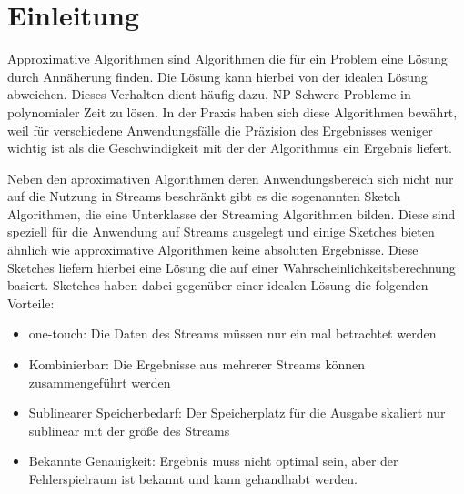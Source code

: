 \section{Einleitung}
Approximative Algorithmen sind Algorithmen die für ein Problem eine Lösung durch Annäherung finden. Die Lösung kann hierbei von der idealen Lösung abweichen. Dieses Verhalten dient häufig dazu, NP-Schwere Probleme in polynomialer Zeit zu lösen.
In der Praxis haben sich diese Algorithmen bewährt, weil für verschiedene Anwendungsfälle die Präzision des Ergebnisses weniger wichtig ist als die Geschwindigkeit mit der der Algorithmus ein Ergebnis liefert.


Neben den aproximativen Algorithmen deren Anwendungsbereich sich nicht nur auf die Nutzung in Streams beschränkt gibt es die sogenannten Sketch Algorithmen, die eine Unterklasse der Streaming Algorithmen bilden. Diese sind speziell für die Anwendung auf Streams ausgelegt und einige Sketches bieten ähnlich wie approximative Algorithmen keine absoluten Ergebnisse. Diese Sketches liefern hierbei eine Lösung die auf einer Wahrscheinlichkeitsberechnung basiert.
Sketches haben dabei gegenüber einer idealen Lösung die folgenden Vorteile:
\begin{itemize}
\item one-touch: Die Daten des Streams müssen nur ein mal betrachtet werden
\item Kombinierbar: Die Ergebnisse aus mehrerer Streams können zusammengeführt werden
\item Sublinearer Speicherbedarf: Der Speicherplatz für die Ausgabe skaliert nur sublinear mit der größe des Streams
\item Bekannte Genauigkeit: Ergebnis muss nicht optimal sein, aber der Fehlerspielraum ist bekannt und kann gehandhabt werden.
\end{itemize}


